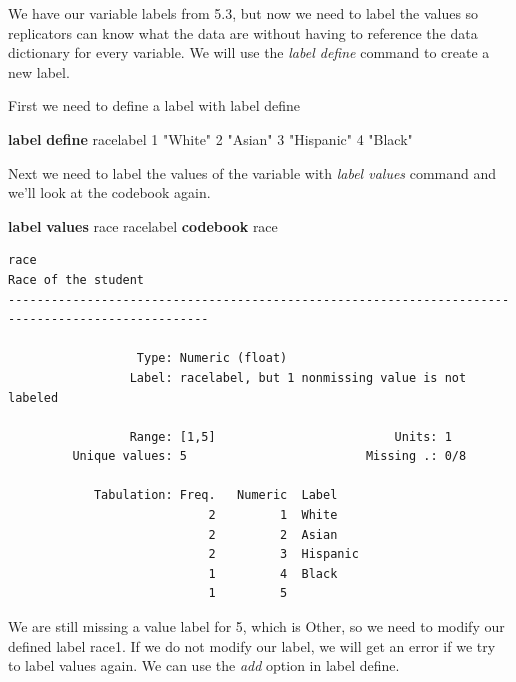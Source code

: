 \documentclass[
]{book}
\newenvironment{Shaded}{\begin{snugshade}}{\end{snugshade}}
\newcommand{\KeywordTok}[1]{\textcolor[rgb]{0.13,0.29,0.53}{\textbf{#1}}}
\newcommand{\NormalTok}[1]{#1}
\newcommand{\StringTok}[1]{\textcolor[rgb]{0.31,0.60,0.02}{#1}}
\begin{document}
We have our variable labels from 5.3, but now we need to label the values so replicators can know what the data are without having to reference the data dictionary for every variable. We will use the \emph{label define} command to create a new label.

First we need to define a label with label define

\begin{Shaded}
\begin{Highlighting}[]
\KeywordTok{label} \KeywordTok{define}\NormalTok{ racelabel 1 }\StringTok{"White"}\NormalTok{ 2 }\StringTok{"Asian"}\NormalTok{ 3 }\StringTok{"Hispanic"}\NormalTok{ 4 }\StringTok{"Black"}
\end{Highlighting}
\end{Shaded}

Next we need to label the values of the variable with \emph{label values} command and we'll look at the codebook again.

\begin{Shaded}
\begin{Highlighting}[]
\KeywordTok{label} \KeywordTok{values}\NormalTok{ race racelabel}
\KeywordTok{codebook}\NormalTok{ race}
\end{Highlighting}
\end{Shaded}

\begin{verbatim}
race                                                                           Race of the student
--------------------------------------------------------------------------------------------------

                  Type: Numeric (float)
                 Label: racelabel, but 1 nonmissing value is not labeled

                 Range: [1,5]                         Units: 1
         Unique values: 5                         Missing .: 0/8

            Tabulation: Freq.   Numeric  Label
                            2         1  White
                            2         2  Asian
                            2         3  Hispanic
                            1         4  Black
                            1         5  
\end{verbatim}

We are still missing a value label for 5, which is Other, so we need to modify our defined label race1. If we do not modify our label, we will get an error if we try to label values again. We can use the \emph{add} option in label define.
\end{document}
